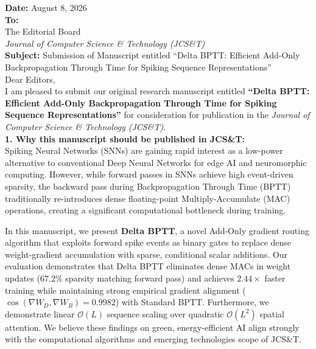 \documentclass[11pt]{article}
\begin{document}
\thispagestyle{empty}

\noindent \textbf{Date:} August 8, 2026 \\

\noindent \textbf{To:} \\
The Editorial Board \\
\emph{Journal of Computer Science \& Technology (JCS\&T)} \\

\noindent \textbf{Subject:} Submission of Manuscript entitled ``Delta BPTT: Efficient Add-Only Backpropagation Through Time for Spiking Sequence Representations'' \\

\noindent Dear Editors, \\

I am pleased to submit our original research manuscript entitled \textbf{``Delta BPTT: Efficient Add-Only Backpropagation Through Time for Spiking Sequence Representations''} for consideration for publication in the \emph{Journal of Computer Science \& Technology (JCS\&T)}. \\

\noindent \textbf{1. Why this manuscript should be published in JCS\&T:} \\
Spiking Neural Networks (SNNs) are gaining rapid interest as a low-power alternative to conventional Deep Neural Networks for edge AI and neuromorphic computing. However, while forward passes in SNNs achieve high event-driven sparsity, the backward pass during Backpropagation Through Time (BPTT) traditionally re-introduces dense floating-point Multiply-Accumulate (MAC) operations, creating a significant computational bottleneck during training. 

In this manuscript, we present \textbf{Delta BPTT}, a novel Add-Only gradient routing algorithm that exploits forward spike events as binary gates to replace dense weight-gradient accumulation with sparse, conditional scalar additions. Our evaluation demonstrates that Delta BPTT eliminates dense MACs in weight updates ($67.2\%$ sparsity matching forward pass) and achieves $2.44\times$ faster training while maintaining strong empirical gradient alignment ($\cos(\nabla W_D, \nabla W_B) = 0.9982$) with Standard BPTT. Furthermore, we demonstrate linear $\mathcal{O}(L)$ sequence scaling over quadratic $\mathcal{O}(L^2)$ spatial attention. We believe these findings on green, energy-efficient AI align strongly with the computational algorithms and emerging technologies scope of JCS\&T. \\
\end{document}
